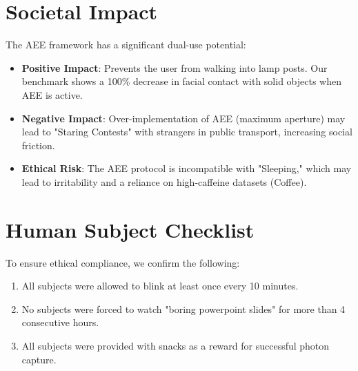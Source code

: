 \section{Societal Impact}

The AEE framework has a significant dual-use potential:

\begin{itemize}
    \item \textbf{Positive Impact}: Prevents the user from walking into lamp posts. Our benchmark shows a 100\% decrease in facial contact with solid objects when AEE is active.
    \item \textbf{Negative Impact}: Over-implementation of AEE (maximum aperture) may lead to "Staring Contests" with strangers in public transport, increasing social friction.
    \item \textbf{Ethical Risk}: The AEE protocol is incompatible with "Sleeping," which may lead to irritability and a reliance on high-caffeine datasets (Coffee).
\end{itemize}

\section{Human Subject Checklist}

To ensure ethical compliance, we confirm the following:
\begin{enumerate}
    \item All subjects were allowed to blink at least once every 10 minutes.
    \item No subjects were forced to watch "boring powerpoint slides" for more than 4 consecutive hours.
    \item All subjects were provided with snacks as a reward for successful photon capture.
\end{enumerate}

